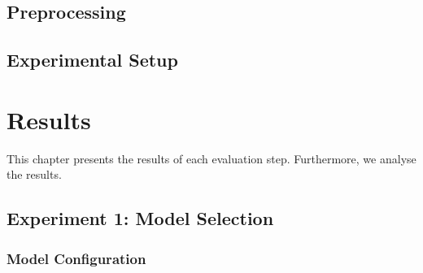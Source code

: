 \documentclass[12pt,a4paper]{report}
\begin{document}
\section{Preprocessing}
\label{sec:preprocessing}


\section{Experimental Setup}
\label{sec:experimental_setup}







\chapter{Results}
\label{ch:results}
This chapter presents the results of each evaluation step. Furthermore, we analyse the results.


% 

% 



% 
% 
% 
\section{Experiment 1: Model Selection}
\label{sec:experiment1}
\subsection{Model Configuration}
\end{document}
